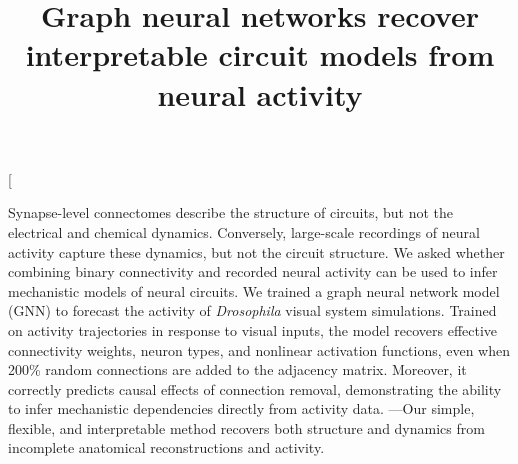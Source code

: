 \documentclass[12pt,twocolumn]{article}
\title{Graph neural networks recover interpretable circuit models from neural activity}
\author{}
\date{}
\begin{document}
\twocolumn[ 
\begin{@twocolumnfalse}
\maketitle
\vspace*{1em}
%
Synapse-level connectomes describe the structure of circuits, but not the electrical and chemical dynamics.  Conversely, large-scale recordings of neural activity capture these dynamics, but not the circuit structure.  We asked whether combining binary connectivity and recorded neural activity can be used to infer mechanistic models of neural circuits.  We trained a graph neural network model (GNN) to forecast the activity of \emph{Drosophila} visual system simulations.  Trained on activity trajectories in response to visual inputs, the model recovers effective connectivity weights, neuron types, and nonlinear activation functions, even when 200\% random connections are added to the adjacency matrix.  Moreover, it correctly predicts causal effects of connection removal, demonstrating the ability to infer mechanistic dependencies directly from activity data.
%
%
---Our simple, flexible, and interpretable method recovers both structure and dynamics from incomplete anatomical reconstructions and activity.


\end{@twocolumnfalse}
\end{document}
